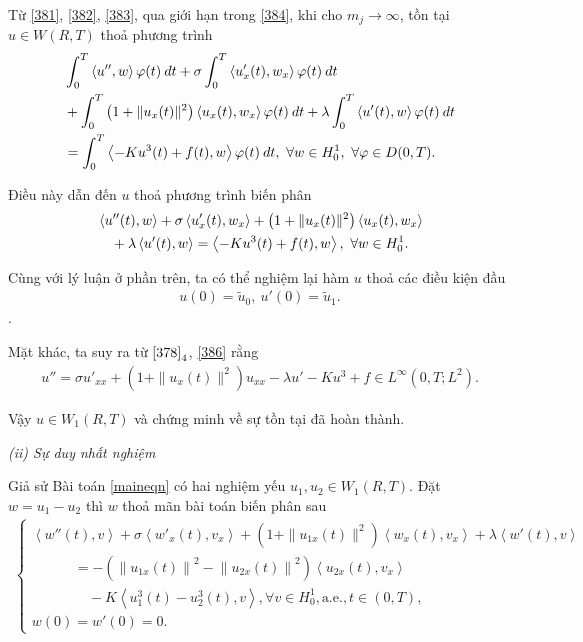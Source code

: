 \documentclass[12pt,a4paper]{article}
\theoremstyle{definition}
\theoremstyle{definition}
\begin{document}
Từ \eqref{381}, \eqref{382}, \eqref{383}, qua giới hạn trong \eqref{384}, khi cho $m_j \to \infty$, tồn tại $u \in W(R,T)$ thoả phương trình
\begin{align}
    &\int_0^T \left<u'',w\right> \varphi(t)\:dt
    + \sigma \int_0^T \left<u'_{x}(t), w_x\right> \varphi(t)\:dt \notag \\
    &+ \int_0^T \left(1 + \|u_x(t)\|^2\right) \left<u_{x}(t), w_x\right> \varphi(t)\:dt
    + \lambda \int_0^T \left<u'(t), w\right> \varphi(t)\:dt \\
    &= \int_0^T \left<-Ku^3(t) + f(t), w\right> \varphi(t)\:dt,\ \forall w \in H^1_0,\ \forall \varphi \in D(0,T). \notag
\end{align}

Điều này dẫn đến $u$ thoả phương trình biến phân
\begin{align} \label{386}
    &\left<u''(t),w\right> + \sigma \left<u'_{x}(t), w_x\right> + \left(1 + \|u_x(t)\|^2\right) \left<u_{x}(t), w_x\right> \\
    &\quad + \lambda \left<u'(t), w\right> = \left<-Ku^3(t) + f(t), w\right>,\ \forall w \in H^1_0. \notag
\end{align}

Cùng với lý luận ở phần trên, ta có thể nghiệm lại hàm $u$ thoả các điều kiện đầu
\begin{align}
    u(0) = \tilde{u}_0,\: u'(0) = \tilde{u}_1.
\end{align}.

Mặt khác, ta suy ra từ $\eqref{378}_4$, \eqref{386} rằng
\begin{align}
    u'' = \sigma u'_{xx} + \left(1 + \|u_x(t)\|^2\right) u_{xx} - \lambda u' - Ku^3 + f \in L^\infty(0,T;L^2).
\end{align}

Vậy $u \in W_1(R,T)$ và chứng minh về sự tồn tại đã hoàn thành.

\textit{(ii) Sự duy nhất nghiệm}

Giả sử Bài toán \eqref{maineqn} có hai nghiệm yếu $u_1, u_2 \in W_1(R,T)$. Đặt $w = u_1 - u_2$ thì $w$ thoả mãn bài toán biến phân sau
\begin{align}
\begin{cases}
    \left<w''(t),v\right> + \sigma \left<w'_x(t),v_x\right> + \left(1 + \|u_{1x}(t)\|^2\right)\left<w_x(t),v_x\right> + \lambda \left<w'(t),v\right> \\
    \quad\quad\quad = -\left(\left\|u_{1x}(t)\right\|^2 - \left\|u_{2x}(t)\right\|^2\right) \left<u_{2x}(t), v_x\right> \\
    \quad\quad\quad\quad - K\left<u_1^3(t) - u_2^3(t), v\right>, \forall v \in H^1_0, \text{a.e.}, t \in (0,T), \\
    w(0) = w'(0) = 0.
\end{cases}
\end{align}
\end{document}
